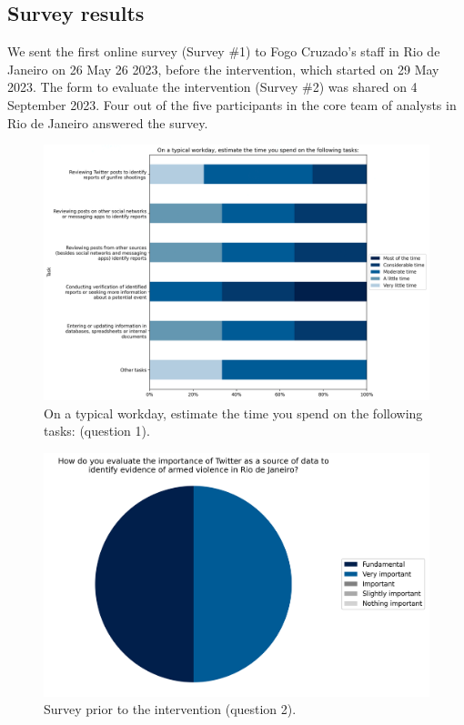 \documentclass[11pt,letterpaper]{article}
\begin{document}
\clearpage

\subsection{Survey results}
\label{app:questionnaire}
We sent the first online survey (Survey \#1) to Fogo Cruzado's staff in Rio de Janeiro on 26 May 26 2023, before the intervention, which started on 29 May 2023. The form to evaluate the intervention (Survey \#2) was shared on 4 September 2023. Four out of the five participants in the core team of analysts in Rio de Janeiro answered the survey. 

\begin{figure}[H]
    \centering
    \includegraphics[width=0.8\linewidth]{figs/appendix/pre-survey/pre_q1.png}
    \caption{On a typical workday, estimate the time you spend on the following tasks: (question 1).}
    \label{fig:presurvey1}
\end{figure}

\begin{figure}[H]
    \centering
    \includegraphics[width=0.8\linewidth]{figs/appendix/pre-survey/pre_q2.png}
    \caption{Survey prior to the intervention (question 2).}
    \label{fig:presurvey2}
\end{figure}
\end{document}
